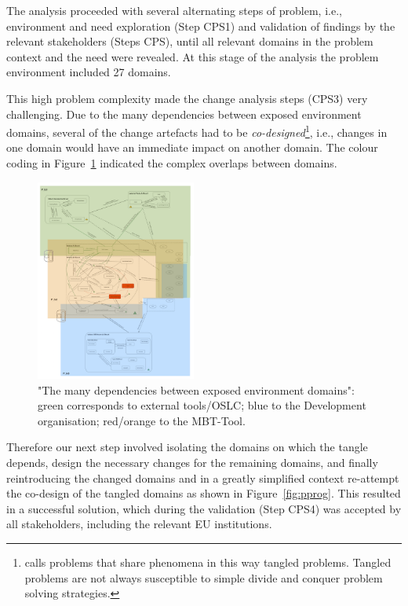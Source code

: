 \documentclass[runningheads,a4paper]{llncs}
\begin{document}
The analysis proceeded with several alternating steps of problem, i.e., environment and need exploration (Step CPS1) and validation of findings by the relevant stakeholders (Steps CPS), until all relevant domains in the problem context and the need were revealed. At this stage of the analysis the problem environment included 27 domains.%


This high problem complexity made the change analysis steps (CPS3) very challenging. Due to the many dependencies between exposed environment domains, several of the change artefacts had to be \textit{co-designed}\footnote{\POE{} calls problems that share phenomena in this way tangled problems. Tangled problems are not always susceptible to simple divide and conquer problem solving strategies.}, i.e.,  changes in one domain would have an immediate impact on another domain. The colour coding in Figure~\ref{fig:tangles} indicated the complex overlaps between domains.

\begin{figure}[htbp]
	\centering
	\includegraphics[width=0.47\textwidth]{pics/tangles.png}
	\caption{"The many dependencies between exposed environment domains": green corresponds to external tools/OSLC; blue to the Development organisation; red/orange to the MBT-Tool.}
	\label{fig:tangles}
\end{figure}

Therefore our next step involved isolating the domains on which the tangle depends, design the necessary changes for the remaining domains, and finally reintroducing the changed domains and in a greatly simplified context re-attempt the co-design of the tangled domains as shown in Figure~\ref{fig:pprog}. This resulted in a successful solution, which during the validation (Step CPS4) was accepted by all stakeholders, including the relevant EU institutions. 
\end{document}
